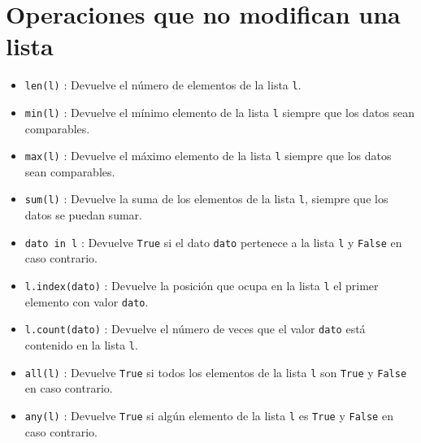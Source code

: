\documentclass[
  spanish,
  a4paper,
]{scrreport}
\providecommand{\tightlist}{%
  \setlength{\itemsep}{0pt}\setlength{\parskip}{0pt}}
\begin{document}
\section{Operaciones que no modifican una
lista}\label{operaciones-que-no-modifican-una-lista}

\begin{itemize}
\tightlist
\item
  \texttt{len(l)} : Devuelve el número de elementos de la lista
  \texttt{l}.
\item
  \texttt{min(l)} : Devuelve el mínimo elemento de la lista \texttt{l}
  siempre que los datos sean comparables.
\item
  \texttt{max(l)} : Devuelve el máximo elemento de la lista \texttt{l}
  siempre que los datos sean comparables.
\item
  \texttt{sum(l)} : Devuelve la suma de los elementos de la lista
  \texttt{l}, siempre que los datos se puedan sumar.
\item
  \texttt{dato\ in\ l} : Devuelve \texttt{True} si el dato \texttt{dato}
  pertenece a la lista \texttt{l} y \texttt{False} en caso contrario.
\item
  \texttt{l.index(dato)} : Devuelve la posición que ocupa en la lista
  \texttt{l} el primer elemento con valor \texttt{dato}.
\item
  \texttt{l.count(dato)} : Devuelve el número de veces que el valor
  \texttt{dato} está contenido en la lista \texttt{l}.
\item
  \texttt{all(l)} : Devuelve \texttt{True} si todos los elementos de la
  lista \texttt{l} son \texttt{True} y \texttt{False} en caso contrario.
\item
  \texttt{any(l)} : Devuelve \texttt{True} si algún elemento de la lista
  \texttt{l} es \texttt{True} y \texttt{False} en caso contrario.
\end{itemize}
\end{document}
